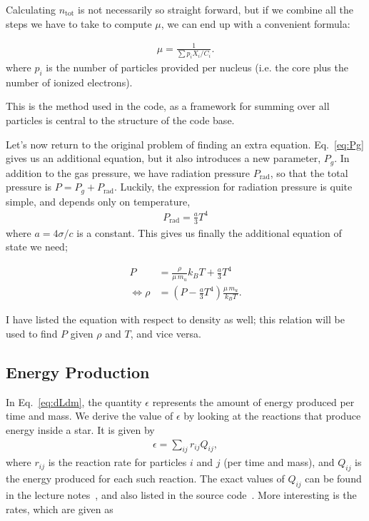 \documentclass[11pt,twocolumn]{article}
\begin{document}
Calculating $n_\text{tot}$ is not necessarily so straight forward, but
if we combine all the steps we have to take to compute $\mu$, we can
end up with a convenient formula:

\begin{align}
  \mu = \frac{1}{\sum p_iX_i/C_i}\label{eq:mu_0}.
\end{align}
where $p_i$ is the number of particles provided per nucleus (i.e. the
core plus the number of ionized electrons).

This is the method used in the code, as a framework for summing over
all particles is central to the structure of the code base.


Let's now return to the original problem of finding an extra
equation. Eq.~\eqref{eq:Pg} gives us an additional equation, but it
also introduces a new parameter, $P_g$. In addition to the gas
pressure, we have radiation pressure $P_{\text{rad}}$, so that the
total pressure is $P = P_g + P_\text{rad}$. Luckily, the expression
for radiation pressure is quite simple, and depends only on
temperature,
\begin{align}
  P_\text{rad} = \frac{ a }{ 3 }T^4
\end{align}
where $a = 4\sigma/c$ is a constant. This gives us finally the
additional equation of state we need;

\begin{align}
  P &= \frac{ \rho }{ \mu\,m_u }k_B T + \frac{ a }{ 3 }T^4\label{eq:P-eq_state}\\
  \Leftrightarrow \rho &= (P - \frac{a}{3}T^4) \frac{ \mu\,m_u }{ k_BT }\label{eq:rho-eq_state}.
\end{align}

I have listed the equation with respect to density as well; this
relation will be used to find $P$ given $\rho$ and $T$, and vice
versa.


\subsection{Energy Production}
\label{sec:energyproduction}
In Eq.~\eqref{eq:dLdm}, the quantity $\epsilon$ represents the amount
of energy produced per time and mass. We derive the value of
$\epsilon$ by looking at the reactions that produce energy inside a
star. It is given by
\begin{align}
  \epsilon = \sum_{ij}r_{ij}Q_{ij},
\end{align}
where $r_{ij}$ is the reaction rate for particles $i$ and $j$ (per
time and mass), and $Q_{ij}$ is the energy produced for each such
reaction. The exact values of $Q_{ij}$ can be found in the lecture
notes~\cite{lecture-notes}, and also listed in the source
code~\cite[\texttt{reaction\_energies.h}]{github}. More interesting is the rates, which are given as
\end{document}
